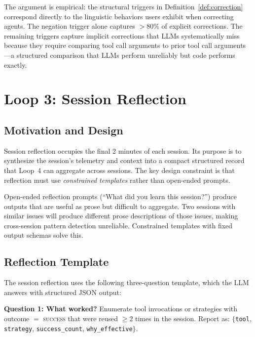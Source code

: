 \documentclass[11pt]{article}
\begin{document}
The argument is empirical: the structural triggers in Definition~\ref{def:correction}
correspond directly to the linguistic behaviors users exhibit when correcting
agents. The negation trigger alone captures $>80\%$ of explicit corrections.
The remaining triggers capture implicit corrections that LLMs systematically
miss because they require comparing tool call arguments to prior tool call
arguments---a structured comparison that LLMs perform unreliably but code
performs exactly.

\section{Loop 3: Session Reflection}
\label{sec:loop3}

\subsection{Motivation and Design}

Session reflection occupies the final 2 minutes of each session. Its purpose
is to synthesize the session's telemetry and context into a compact structured
record that Loop~4 can aggregate across sessions. The key design constraint is
that reflection must use \emph{constrained templates} rather than open-ended
prompts.

Open-ended reflection prompts (``What did you learn this session?'') produce
outputs that are useful as prose but difficult to aggregate. Two sessions with
similar issues will produce different prose descriptions of those issues,
making cross-session pattern detection unreliable. Constrained templates with
fixed output schemas solve this.

\subsection{Reflection Template}

The session reflection uses the following three-question template, which
the LLM answers with structured JSON output:

\vspace{0.5em}
\noindent\textbf{Question 1: What worked?}
Enumerate tool invocations or strategies with outcome $=$ \textsc{success}
that were reused $\geq 2$ times in the session. Report as:
$\{$\texttt{tool}, \texttt{strategy}, \texttt{success\_count}, \texttt{why\_effective}$\}$.
\end{document}
